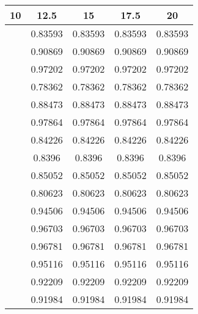 \begin{tabular}{|c|c|c|c|c|}
\hline 
10 & 12.5 & 15 & 17.5 & 20 \\ 
\hline 
 & 0.83593 & 0.83593 & 0.83593 & 0.83593 \\ 
 & 0.90869 & 0.90869 & 0.90869 & 0.90869 \\ 
 & 0.97202 & 0.97202 & 0.97202 & 0.97202 \\ 
 & 0.78362 & 0.78362 & 0.78362 & 0.78362 \\ 
 & 0.88473 & 0.88473 & 0.88473 & 0.88473 \\ 
 & 0.97864 & 0.97864 & 0.97864 & 0.97864 \\ 
 & 0.84226 & 0.84226 & 0.84226 & 0.84226 \\ 
 & 0.8396 & 0.8396 & 0.8396 & 0.8396 \\ 
 & 0.85052 & 0.85052 & 0.85052 & 0.85052 \\ 
 & 0.80623 & 0.80623 & 0.80623 & 0.80623 \\ 
 & 0.94506 & 0.94506 & 0.94506 & 0.94506 \\ 
 & 0.96703 & 0.96703 & 0.96703 & 0.96703 \\ 
 & 0.96781 & 0.96781 & 0.96781 & 0.96781 \\ 
 & 0.95116 & 0.95116 & 0.95116 & 0.95116 \\ 
 & 0.92209 & 0.92209 & 0.92209 & 0.92209 \\ 
 & 0.91984 & 0.91984 & 0.91984 & 0.91984 \\ 
\hline 
\end{tabular}